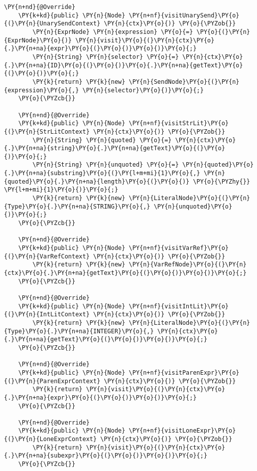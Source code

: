 \begin{Verbatim}[commandchars=\\\{\}]
    \PY{n+nd}{@Override}
    \PY{k+kd}{public} \PY{n}{Node} \PY{n+nf}{visitUnarySend}\PY{o}{(}\PY{n}{UnarySendContext} \PY{n}{ctx}\PY{o}{)} \PY{o}{\PYZob{}}
        \PY{n}{ExprNode} \PY{n}{expression} \PY{o}{=} \PY{o}{(}\PY{n}{ExprNode}\PY{o}{)} \PY{n}{visit}\PY{o}{(}\PY{n}{ctx}\PY{o}{.}\PY{n+na}{expr}\PY{o}{(}\PY{o}{)}\PY{o}{)}\PY{o}{;}
        \PY{n}{String} \PY{n}{selector} \PY{o}{=} \PY{n}{ctx}\PY{o}{.}\PY{n+na}{ID}\PY{o}{(}\PY{o}{)}\PY{o}{.}\PY{n+na}{getText}\PY{o}{(}\PY{o}{)}\PY{o}{;}
        \PY{k}{return} \PY{k}{new} \PY{n}{SendNode}\PY{o}{(}\PY{n}{expression}\PY{o}{,} \PY{n}{selector}\PY{o}{)}\PY{o}{;}
    \PY{o}{\PYZcb{}}

    \PY{n+nd}{@Override}
    \PY{k+kd}{public} \PY{n}{Node} \PY{n+nf}{visitStrLit}\PY{o}{(}\PY{n}{StrLitContext} \PY{n}{ctx}\PY{o}{)} \PY{o}{\PYZob{}}
        \PY{n}{String} \PY{n}{quoted} \PY{o}{=} \PY{n}{ctx}\PY{o}{.}\PY{n+na}{string}\PY{o}{.}\PY{n+na}{getText}\PY{o}{(}\PY{o}{)}\PY{o}{;}
        \PY{n}{String} \PY{n}{unquoted} \PY{o}{=} \PY{n}{quoted}\PY{o}{.}\PY{n+na}{substring}\PY{o}{(}\PY{l+m+mi}{1}\PY{o}{,} \PY{n}{quoted}\PY{o}{.}\PY{n+na}{length}\PY{o}{(}\PY{o}{)} \PY{o}{\PYZhy{}} \PY{l+m+mi}{1}\PY{o}{)}\PY{o}{;}
        \PY{k}{return} \PY{k}{new} \PY{n}{LiteralNode}\PY{o}{(}\PY{n}{Type}\PY{o}{.}\PY{n+na}{STRING}\PY{o}{,} \PY{n}{unquoted}\PY{o}{)}\PY{o}{;}
    \PY{o}{\PYZcb{}}

    \PY{n+nd}{@Override}
    \PY{k+kd}{public} \PY{n}{Node} \PY{n+nf}{visitVarRef}\PY{o}{(}\PY{n}{VarRefContext} \PY{n}{ctx}\PY{o}{)} \PY{o}{\PYZob{}}
        \PY{k}{return} \PY{k}{new} \PY{n}{VarRefNode}\PY{o}{(}\PY{n}{ctx}\PY{o}{.}\PY{n+na}{getText}\PY{o}{(}\PY{o}{)}\PY{o}{)}\PY{o}{;}
    \PY{o}{\PYZcb{}}

    \PY{n+nd}{@Override}
    \PY{k+kd}{public} \PY{n}{Node} \PY{n+nf}{visitIntLit}\PY{o}{(}\PY{n}{IntLitContext} \PY{n}{ctx}\PY{o}{)} \PY{o}{\PYZob{}}
        \PY{k}{return} \PY{k}{new} \PY{n}{LiteralNode}\PY{o}{(}\PY{n}{Type}\PY{o}{.}\PY{n+na}{INTEGER}\PY{o}{,} \PY{n}{ctx}\PY{o}{.}\PY{n+na}{getText}\PY{o}{(}\PY{o}{)}\PY{o}{)}\PY{o}{;}
    \PY{o}{\PYZcb{}}

    \PY{n+nd}{@Override}
    \PY{k+kd}{public} \PY{n}{Node} \PY{n+nf}{visitParenExpr}\PY{o}{(}\PY{n}{ParenExprContext} \PY{n}{ctx}\PY{o}{)} \PY{o}{\PYZob{}}
        \PY{k}{return} \PY{n}{visit}\PY{o}{(}\PY{n}{ctx}\PY{o}{.}\PY{n+na}{expr}\PY{o}{(}\PY{o}{)}\PY{o}{)}\PY{o}{;}
    \PY{o}{\PYZcb{}}

    \PY{n+nd}{@Override}
    \PY{k+kd}{public} \PY{n}{Node} \PY{n+nf}{visitLoneExpr}\PY{o}{(}\PY{n}{LoneExprContext} \PY{n}{ctx}\PY{o}{)} \PY{o}{\PYZob{}}
        \PY{k}{return} \PY{n}{visit}\PY{o}{(}\PY{n}{ctx}\PY{o}{.}\PY{n+na}{subexpr}\PY{o}{(}\PY{o}{)}\PY{o}{)}\PY{o}{;}
    \PY{o}{\PYZcb{}}    
    

\end{Verbatim}
